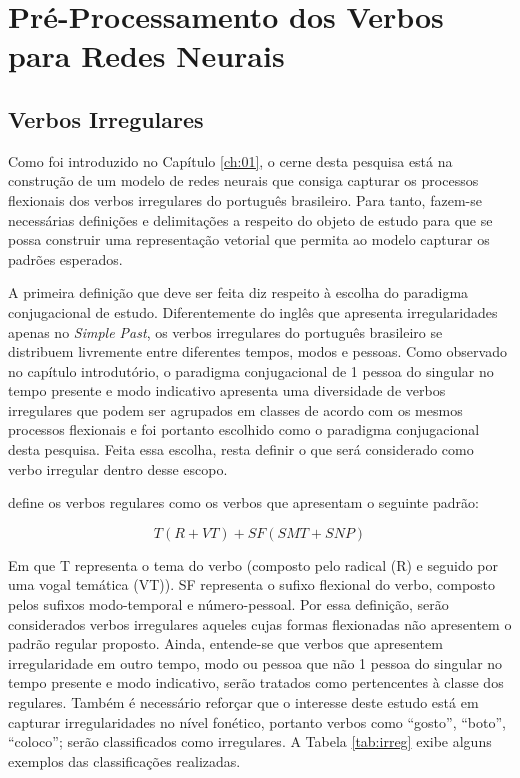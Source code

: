 \chapter{Pré-Processamento dos Verbos para Redes Neurais}
\label{ch:02}

\section{Verbos Irregulares}

Como foi introduzido no Capítulo \ref{ch:01}, o cerne desta pesquisa está na construção de um modelo de redes neurais que consiga capturar os processos flexionais dos verbos irregulares do português brasileiro. Para tanto, fazem-se necessárias definições e delimitações a respeito do objeto de estudo para que se possa construir uma representação vetorial que permita ao modelo capturar os padrões esperados.

A primeira definição que deve ser feita diz respeito à escolha do paradigma conjugacional de estudo. Diferentemente do inglês que apresenta irregularidades apenas no \textit{Simple Past}, os verbos irregulares do português brasileiro se distribuem livremente entre diferentes tempos, modos e pessoas. Como observado no capítulo introdutório, o paradigma conjugacional de 1 pessoa do singular no tempo presente e modo indicativo apresenta uma diversidade de verbos irregulares que podem ser agrupados em classes de acordo com os mesmos processos flexionais e foi portanto escolhido como o paradigma conjugacional desta pesquisa.
Feita essa escolha, resta definir o que será considerado como verbo irregular dentro desse escopo. 

\cite{1972:camara} define os verbos regulares como os verbos que apresentam o seguinte padrão:

\begin{equation}
    T (R + VT) + SF (SMT + SNP)
\end{equation}

Em que T representa o tema do verbo (composto pelo radical (R) e seguido por uma vogal temática (VT)). SF representa o sufixo flexional do verbo, composto pelos sufixos modo-temporal e número-pessoal. Por essa definição, serão considerados verbos irregulares aqueles cujas formas flexionadas não apresentem o padrão regular proposto. Ainda, entende-se que verbos que apresentem irregularidade em outro tempo, modo ou pessoa que não 1 pessoa do singular no tempo presente e modo indicativo, serão tratados como pertencentes à classe dos regulares. Também é necessário reforçar que o interesse deste estudo está em capturar irregularidades no nível fonético, portanto verbos como “gosto”, “boto”, “coloco”; serão classificados como irregulares. A Tabela \ref{tab:irreg} exibe alguns exemplos das classificações realizadas.

